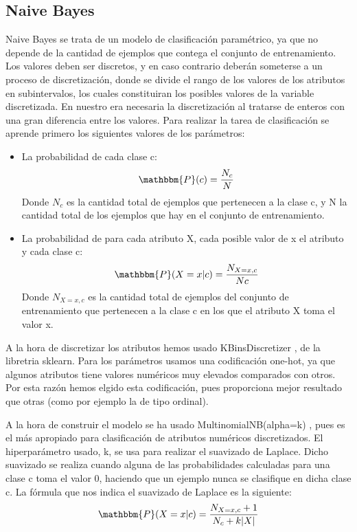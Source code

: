 \documentclass[conference,a4paper]{IEEEtran}
\begin{document}
\subsection{Naive Bayes}
Naive Bayes se trata de un modelo de clasificación paramétrico, ya que no depende de la cantidad de ejemplos que contega el conjunto de entrenamiento. Los valores deben ser discretos, y en caso contrario deberán someterse a un proceso de discretización, donde se divide el rango de los valores de los atributos en subintervalos, los cuales constituiran los posibles valores de la variable discretizada. En nuestro era necesaria la discretización al tratarse de enteros con una gran diferencia entre los valores.
Para realizar la tarea de clasificación se aprende primero los siguientes valores de los parámetros:
\begin{itemize}
\item La probabilidad de cada clase c:
\begin{equation}
\mathbbm{P}(c) = \frac{ N_{c}}{N}
\end{equation}
Donde $N_{c}$ es la cantidad total de ejemplos que pertenecen a la clase c, y N la cantidad total de los ejemplos que hay en el conjunto de entrenamiento.
\\ 
\item La probabilidad de para cada atributo X, cada posible valor de x el atributo y cada clase c:
\begin{equation}
\mathbbm{P}(X = x | c) = \frac{N_{X=x,c}}{N{c}}
\end{equation}
Donde $N_{X=x,c}$  es la cantidad total de ejemplos del conjunto de entrenamiento que pertenecen a la clase c en los que el atributo X toma el valor x.
\end{itemize}

A la hora de discretizar los atributos hemos usado KBinsDiscretizer \cite{b3}, de la libretria sklearn. Para los parámetros usamos una codificación one-hot, ya que algunos atributos tiene valores numéricos muy elevados comparados con otros. Por esta razón hemos elgido esta codificación, pues proporciona mejor resultado que otras (como por ejemplo la de tipo ordinal).

A la hora de construir el modelo se ha usado MultinomialNB(alpha=k)  \cite{b4}, pues es el más apropiado para clasificación de atributos numéricos discretizados. El hiperparámetro usado, k, se usa para realizar el suavizado de Laplace. Dicho suavizado se realiza cuando alguna de las probabilidades calculadas para una clase c toma el valor 0, haciendo que un ejemplo nunca se clasifique en dicha clase c. La fórmula que nos indica el suavizado de Laplace es la siguiente:
\begin{equation}
\mathbbm{P}(X = x | c) = \frac{N_{X=x,c}+1}{N_{c} + k|X|}
\end{equation}
\end{document}
